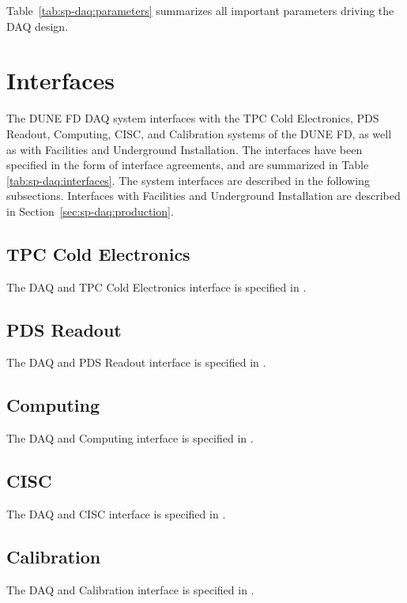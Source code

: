 Table~\ref{tab:sp-daq:parameters} summarizes all important parameters
driving the DAQ design.



\section{Interfaces}
\label{sec:sp-daq:interfaces}
The DUNE FD DAQ system interfaces with the TPC Cold Electronics, PDS
Readout, Computing, CISC, and Calibration systems of the DUNE
FD, as well as with Facilities and Underground Installation. The
interfaces have been specified in the form of interface agreements,
and are summarized in Table \ref{tab:sp-daq:interfaces}. The system
interfaces are described in the following subsections. Interfaces with
Facilities and Underground Installation are described in Section~\ref{sec:sp-daq:production}.


\subsection{TPC Cold Electronics}
The DAQ and TPC Cold Electronics interface is specified in \cite{docid-6742}.
\subsection{PDS Readout}
The DAQ and PDS Readout interface is specified in \cite{docid-6727}.
\subsection{Computing}
The DAQ and Computing interface is specified in \cite{docid-7123}.
\subsection{CISC}
\label{sec:sp-daq:interfaces-cisc}
The DAQ and CISC interface is specified in \cite{docid-6790}.
\subsection{Calibration}
The DAQ and Calibration interface is specified in \cite{docid-7069}.

